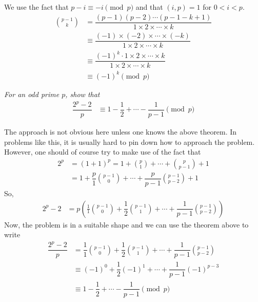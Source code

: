 \documentclass[12pt]{subfile}
\begin{document}
		\begin{solution}
			We use the fact that $p-i\equiv-i\pmod p$ and that $(i,p)=1$ for $0<i<p$.
				\begin{align*}
					\binom{p-1}{k}
						& = \dfrac{(p-1)(p-2)\cdots(p-1-k+1)}{1\times 2 \times \cdots \times k}\\
						& \equiv \dfrac{(-1) \times (-2) \times \cdots \times (-k)}{1\times 2 \times \cdots \times k}\\
						& \equiv\dfrac{(-1)^k \cdot 1\times 2 \times \cdots \times k}{1\times 2 \times \cdots \times k}\\
						& \equiv(-1)^k\pmod p
				\end{align*}

		\end{solution}

		\begin{problem}\slshape
			For an odd prime $p$, show that
				\begin{align*}
					\dfrac{2^p-2}{p} & \equiv1-\dfrac{1}{2}+\cdots-\dfrac{1}{p-1}\pmod p
				\end{align*}
		\end{problem}

		\begin{solution}
			The approach is not obvious here unless one knows the above theorem. In problems like this, it is usually hard to pin down how to approach the problem. However, one should of course try to make use of the fact that
				\begin{align*}
					2^p
						& = (1+1)^p = 1+\binom{p}{1}+\cdots+\binom{p}{p-1}+1\\
						& = 1+\dfrac{p}{1}\binom{p-1}{0}+\cdots+\dfrac{p}{p-1}\binom{p-1}{p-2}+1
				\end{align*}
			So,
				\begin{align*}
					2^p-2
						& = p\left(\frac{1}{1}\binom{p-1}{0}+\dfrac{1}{2}\binom{p-1}{1}+\cdots+\dfrac{1}{p-1}\binom{p-1}{p-2}\right)
				\end{align*}
			Now, the problem is in a suitable shape and we can use the theorem above to write
				\begin{align*}
					\dfrac{2^p-2}{p}
						& = \dfrac{1}{1}\binom{p-1}{0}+\dfrac{1}{2}\binom{p-1}{1}+\cdots+\dfrac{1}{p-1}\binom{p-1}{p-2}\\
						& \equiv(-1)^0+\dfrac{1}{2}(-1)^1+\cdots+\dfrac{1}{p-1}(-1)^{p-3}\\
						& \equiv1-\dfrac{1}{2}+\cdots-\dfrac{1}{p-1}\pmod p
				\end{align*}

		\end{solution}
\end{document}
